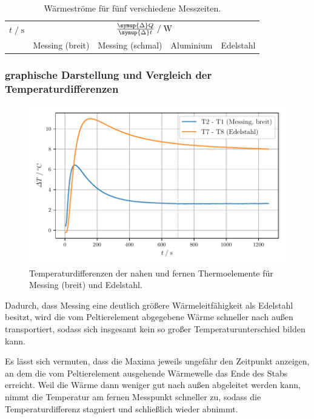 \begin{table}[H]
     \centering
     \caption{Wärmeströme für fünf verschiedene Messzeiten.}
     \label{tab:waermestroeme}
     \begin{tabular}{c c c c c}
      \toprule
      $t \;/\; \si{\second}$ &
      \multicolumn{4}{c}{$\frac{\symup{\Delta} Q}{\symup{\Delta} t} \;/\; \si{\watt}$} \\
      \cmidrule(lr){2-5}
      &
      Messing (breit) &
      Messing (schmal) &
      Aluminium &
      Edelstahl \\
      \midrule
      
      \bottomrule
     \end{tabular}
\end{table}


\subsubsection{graphische Darstellung und Vergleich der Temperaturdifferenzen}

\begin{figure}[H]
  \centering
  \includegraphics{build/plot_statisch_tdiff.pdf}
  \caption{Temperaturdifferenzen der nahen und fernen Thermoelemente für Messing (breit) und Edelstahl.}
  \label{fig:statisch_tdiff}
\end{figure}

Dadurch, dass Messing eine deutlich größere Wärmeleitfähigkeit als Edelstahl besitzt,
wird die vom Peltierelement abgegebene Wärme schneller nach außen transportiert,
sodass sich insgesamt kein so großer Temperaturunterschied bilden kann.

Es lässt sich vermuten, dass die Maxima jeweils ungefähr den Zeitpunkt anzeigen,
an dem die vom Peltierelement ausgehende Wärmewelle das Ende des Stabs erreicht.
Weil die Wärme dann weniger gut nach außen abgeleitet werden kann,
nimmt die Temperatur am fernen Messpunkt schneller zu,
sodass die Temperaturdifferenz stagniert und schließlich wieder abnimmt.


